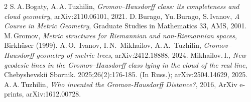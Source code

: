 \documentclass{article}
\theoremstyle{definition}
\theoremstyle{plain}
\renewcommand{\:}{\colon}
\newcommand{\0}{\emptyset}
\renewcommand{\(}{\rom(}
\renewcommand{\)}{\rom)}
\begin{document}
\begin{thebibliography}{2}
 S.\,A.\,Bogaty, A.\,A.\,Tuzhilin, \emph{Gromov--Hausdorff class: its completeness and cloud geometry}, arXiv:2110.06101, 2021.
 D.\,Burago, Yu.\,Burago, S.\,Ivanov, \emph{A Course in Metric Geometry}, Graduate Studies in Mathematics 33, AMS, 2001.
 M.\,Gromov, \emph{Metric structures for Riemannian and non-Riemannian spaces}, Birkh\"user
(1999). 
 A.\,O.~Ivanov, I.\,N.~Mikhailov, A.\,A.~Tuzhilin, \emph{Gromov--Hausdorff geometry of metric trees}, arXiv:2412.18888, 2024.
 Mikhailov.\,I., \emph{New geodesic lines in the Gromov--Hausdorff class lying in the cloud of the real line}, Chebyshevskii Sbornik. 2025;26(2):176-185. (In Russ.); arXiv:2504.14629, 2025.
 A.\,A.\,Tuzhilin, \emph{Who invented the Gromov-Hausdorff Distance?}, 2016, ArXiv e-prints, arXiv:1612.00728.




\end{thebibliography}
\end{document}
